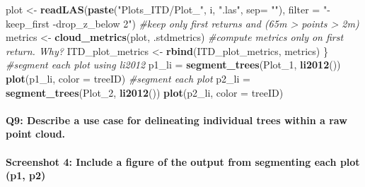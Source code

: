 \documentclass[
]{book}
\newenvironment{Shaded}{\begin{snugshade}}{\end{snugshade}}
\newcommand{\AttributeTok}[1]{\textcolor[rgb]{0.13,0.29,0.53}{#1}}
\newcommand{\CommentTok}[1]{\textcolor[rgb]{0.56,0.35,0.01}{\textit{#1}}}
\newcommand{\FunctionTok}[1]{\textcolor[rgb]{0.13,0.29,0.53}{\textbf{#1}}}
\newcommand{\NormalTok}[1]{#1}
\newcommand{\OtherTok}[1]{\textcolor[rgb]{0.56,0.35,0.01}{#1}}
\newcommand{\StringTok}[1]{\textcolor[rgb]{0.31,0.60,0.02}{#1}}
\begin{document}
\begin{Shaded}
\begin{Highlighting}[]
\NormalTok{  plot }\OtherTok{\textless{}{-}} \FunctionTok{readLAS}\NormalTok{(}\FunctionTok{paste}\NormalTok{(}\StringTok{"Plots\_ITD/Plot\_"}\NormalTok{, i, }\StringTok{".las"}\NormalTok{, }\AttributeTok{sep=} \StringTok{""}\NormalTok{), }\AttributeTok{filter =} \StringTok{"{-}keep\_first {-}drop\_z\_below 2"}\NormalTok{) }\CommentTok{\#keep only first returns and (65m \textgreater{} points \textgreater{} 2m)}
\NormalTok{  metrics }\OtherTok{\textless{}{-}} \FunctionTok{cloud\_metrics}\NormalTok{(plot, .stdmetrics) }\CommentTok{\#compute metrics only on first return. Why?}
\NormalTok{  ITD\_plot\_metrics }\OtherTok{\textless{}{-}} \FunctionTok{rbind}\NormalTok{(ITD\_plot\_metrics, metrics)}
\NormalTok{\}}
\CommentTok{\#segment each plot using li2012}
\NormalTok{p1\_li }\OtherTok{=} \FunctionTok{segment\_trees}\NormalTok{(Plot\_1, }\FunctionTok{li2012}\NormalTok{())}
\FunctionTok{plot}\NormalTok{(p1\_li, }\AttributeTok{color =} \StringTok{\textquotesingle{}treeID\textquotesingle{}}\NormalTok{)}
\CommentTok{\#segment each plot}
\NormalTok{p2\_li }\OtherTok{=} \FunctionTok{segment\_trees}\NormalTok{(Plot\_2, }\FunctionTok{li2012}\NormalTok{())}
\FunctionTok{plot}\NormalTok{(p2\_li, }\AttributeTok{color =} \StringTok{\textquotesingle{}treeID\textquotesingle{}}\NormalTok{)}
\end{Highlighting}
\end{Shaded}

\hypertarget{q9-describe-a-use-case-for-delineating-individual-trees-within-a-raw-point-cloud.}{%
\paragraph*{Q9: Describe a use case for delineating individual trees within a raw point cloud.}\label{q9-describe-a-use-case-for-delineating-individual-trees-within-a-raw-point-cloud.}}

\hypertarget{screenshot-4-include-a-figure-of-the-output-from-segmenting-each-plot-p1-p2}{%
\paragraph*{Screenshot 4: Include a figure of the output from segmenting each plot (p1, p2)}\label{screenshot-4-include-a-figure-of-the-output-from-segmenting-each-plot-p1-p2}}
\end{document}
